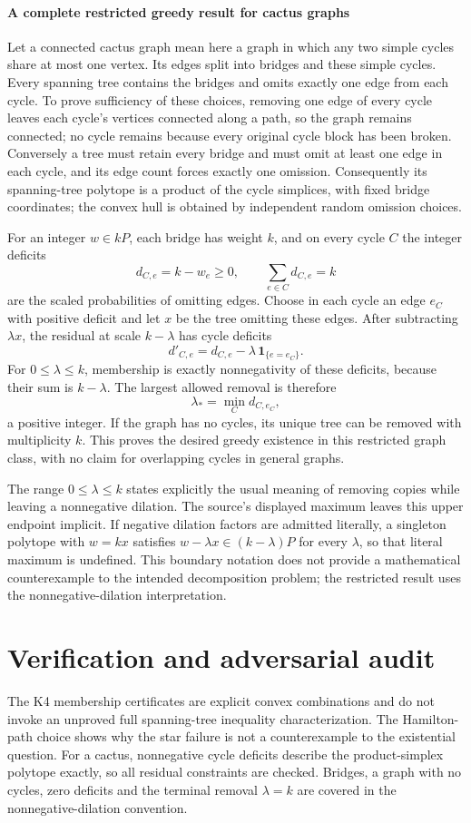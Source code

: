 \documentclass[11pt]{article}
\begin{document}
\paragraph{A complete restricted greedy result for cactus graphs}
Let a connected cactus graph mean here a graph in which any two simple cycles share at most one vertex. Its edges split into bridges and these simple cycles. Every spanning tree contains the bridges and omits exactly one edge from each cycle. To prove sufficiency of these choices, removing one edge of every cycle leaves each cycle's vertices connected along a path, so the graph remains connected; no cycle remains because every original cycle block has been broken. Conversely a tree must retain every bridge and must omit at least one edge in each cycle, and its edge count forces exactly one omission. Consequently its spanning-tree polytope is a product of the cycle simplices, with fixed bridge coordinates; the convex hull is obtained by independent random omission choices.

For an integer $w\in kP$, each bridge has weight $k$, and on every cycle $C$ the integer deficits
\[
 d_{C,e}=k-w_e\geq0,\qquad \sum_{e\in C}d_{C,e}=k
\]
are the scaled probabilities of omitting edges. Choose in each cycle an edge $e_C$ with positive deficit and let $x$ be the tree omitting these edges. After subtracting $\lambda x$, the residual at scale $k-\lambda$ has cycle deficits
\[
 d'_{C,e}=d_{C,e}-\lambda\,\mathbf1_{\{e=e_C\}}.
\]
For $0\leq\lambda\leq k$, membership is exactly nonnegativity of these deficits, because their sum is $k-\lambda$. The largest allowed removal is therefore
\[
 \lambda_* =\min_C d_{C,e_C},
\]
a positive integer. If the graph has no cycles, its unique tree can be removed with multiplicity $k$. This proves the desired greedy existence in this restricted graph class, with no claim for overlapping cycles in general graphs.

The range $0\leq\lambda\leq k$ states explicitly the usual meaning of removing copies while leaving a nonnegative dilation. The source's displayed maximum leaves this upper endpoint implicit. If negative dilation factors are admitted literally, a singleton polytope with $w=kx$ satisfies $w-\lambda x\in(k-\lambda)P$ for every $\lambda$, so that literal maximum is undefined. This boundary notation does not provide a mathematical counterexample to the intended decomposition problem; the restricted result uses the nonnegative-dilation interpretation.

\section{Verification and adversarial audit}
The K4 membership certificates are explicit convex combinations and do not invoke an unproved full spanning-tree inequality characterization. The Hamilton-path choice shows why the star failure is not a counterexample to the existential question. For a cactus, nonnegative cycle deficits describe the product-simplex polytope exactly, so all residual constraints are checked. Bridges, a graph with no cycles, zero deficits and the terminal removal $\lambda=k$ are covered in the nonnegative-dilation convention.
\end{document}
